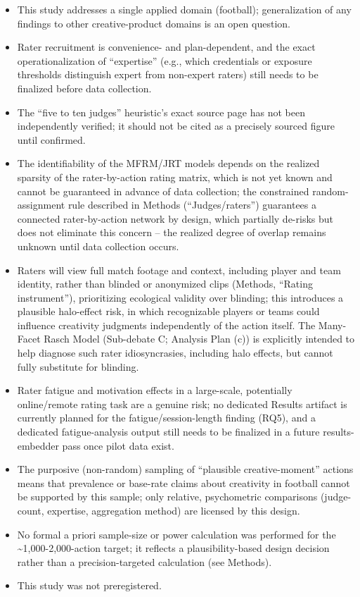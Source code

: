 \documentclass[
  12pt,
]{article}
\providecommand{\tightlist}{%
  \setlength{\itemsep}{0pt}\setlength{\parskip}{0pt}}
\begin{document}
\begin{itemize}
\tightlist
\item
  This study addresses a single applied domain (football);
  generalization of any findings to other creative-product domains is an
  open question.
\item
  Rater recruitment is convenience- and plan-dependent, and the exact
  operationalization of ``expertise'' (e.g., which credentials or
  exposure thresholds distinguish expert from non-expert raters) still
  needs to be finalized before data collection.
\item
  The ``five to ten judges'' heuristic's exact source page has not been
  independently verified; it should not be cited as a precisely sourced
  figure until confirmed.
\item
  The identifiability of the MFRM/JRT models depends on the realized
  sparsity of the rater-by-action rating matrix, which is not yet known
  and cannot be guaranteed in advance of data collection; the
  constrained random-assignment rule described in Methods
  (``Judges/raters'') guarantees a connected rater-by-action network by
  design, which partially de-risks but does not eliminate this concern
  -- the realized degree of overlap remains unknown until data
  collection occurs.
\item
  Raters will view full match footage and context, including player and
  team identity, rather than blinded or anonymized clips (Methods,
  ``Rating instrument''), prioritizing ecological validity over
  blinding; this introduces a plausible halo-effect risk, in which
  recognizable players or teams could influence creativity judgments
  independently of the action itself. The Many-Facet Rasch Model
  (Sub-debate C; Analysis Plan (c)) is explicitly intended to help
  diagnose such rater idiosyncrasies, including halo effects, but cannot
  fully substitute for blinding.
\item
  Rater fatigue and motivation effects in a large-scale, potentially
  online/remote rating task are a genuine risk; no dedicated Results
  artifact is currently planned for the fatigue/session-length finding
  (RQ5), and a dedicated fatigue-analysis output still needs to be
  finalized in a future results-embedder pass once pilot data exist.
\item
  The purposive (non-random) sampling of ``plausible creative-moment''
  actions means that prevalence or base-rate claims about creativity in
  football cannot be supported by this sample; only relative,
  psychometric comparisons (judge-count, expertise, aggregation method)
  are licensed by this design.
\item
  No formal a priori sample-size or power calculation was performed for
  the \textasciitilde1,000-2,000-action target; it reflects a
  plausibility-based design decision rather than a precision-targeted
  calculation (see Methods).
\item
  This study was not preregistered.
\end{itemize}
\end{document}
